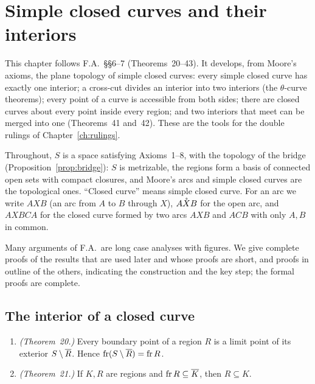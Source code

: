 \chapter{Simple closed curves and their interiors}\label{ch:curves}

This chapter follows F.A.\ \S\S6--7 (Theorems~20--43). It develops, from Moore's axioms, the plane
topology of simple closed curves: every simple closed curve has exactly one interior; a cross-cut
divides an interior into two interiors (the $\theta$-curve theorems); every point of a curve is
accessible from both sides; there are closed curves about every point inside every region; and two
interiors that meet can be merged into one (Theorems~41 and~42). These are the tools for the double
rulings of Chapter~\ref{ch:rulings}.

Throughout, $S$ is a space satisfying Axioms~1--8, with the topology of the bridge
(Proposition~\ref{prop:bridge}): $S$ is metrizable, the regions form a basis of connected open sets
with compact closures, and Moore's arcs and simple closed curves are the topological ones. ``Closed
curve'' means simple closed curve. For an arc we write $AXB$ (an arc from $A$ to $B$ through $X$),
$\mathring{AXB}$ for the open arc, and $AXBCA$ for the closed curve formed by two arcs $AXB$ and $ACB$ with
only $A,B$ in common.

Many arguments of F.A.\ are long case analyses with figures. We give complete proofs of the results
that are used later and whose proofs are short, and proofs in outline of the others, indicating the
construction and the key step; the formal proofs are complete.

\section{The interior of a closed curve}

\begin{theorem}\label{thm:fa20-21}
\leavevmode
\begin{enumerate}[label=(\alph*)]
\item \emph{(Theorem~20.)} Every boundary point of a region $R$ is a limit point of its exterior
$S\setminus\overline{R}$. Hence $\operatorname{fr}(S\setminus\overline{R})=\operatorname{fr} R$.
\item \emph{(Theorem~21.)} If $K,R$ are regions and $\operatorname{fr} R\subseteq\overline{K}$, then $R\subseteq K$.
\end{enumerate}
\end{theorem}

